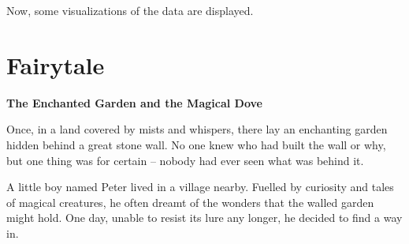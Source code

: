 \documentclass[10pt, a4paper, titlepage]{article} %
\begin{document}
Now, some visualizations of the data are displayed.


\section{Fairytale}

\textbf{The Enchanted Garden and the Magical Dove}

Once, in a land covered by mists and whispers, there lay an enchanting garden hidden behind a great stone wall. No one knew who had built the wall or why, but one thing was for certain – nobody had ever seen what was behind it.

A little boy named Peter lived in a village nearby. Fuelled by curiosity and tales of magical creatures, he often dreamt of the wonders that the walled garden might hold. One day, unable to resist its lure any longer, he decided to find a way in.
\end{document}
